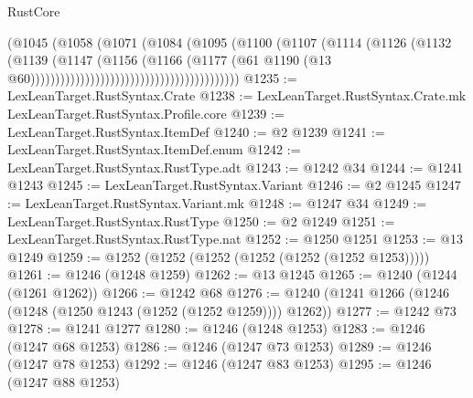 \begin{lexlean}{RustCore}
\begin{coremodule}
{\begin{coremodule}
{{{{{{{{{{{{{{{{{{{{{{{{{{{{{{{{{{{{{{{{{{{{{                                                      (@1045
                                                        (@1058
                                                          (@1071
                                                            (@1084
                                                              (@1095
                                                                (@1100
                                                                  (@1107
                                                                    (@1114
                                                                      (@1126
                                                                        (@1132
                                                                          (@1139
                                                                            (@1147
                                                                              (@1156
                                                                                (@1166
                                                                                  (@1177
                                                                                    (@61
                                                                                      @1190
                                                                                      (@13
                                                                                        @60))))))))))))))))))))))))))))))))))))))))))
@1235 := LexLeanTarget.RustSyntax.Crate
@1238 := LexLeanTarget.RustSyntax.Crate.mk LexLeanTarget.RustSyntax.Profile.core
@1239 := LexLeanTarget.RustSyntax.ItemDef
@1240 := @2 @1239
@1241 := LexLeanTarget.RustSyntax.ItemDef.enum
@1242 := LexLeanTarget.RustSyntax.RustType.adt
@1243 := @1242 @34
@1244 := @1241 @1243
@1245 := LexLeanTarget.RustSyntax.Variant
@1246 := @2 @1245
@1247 := LexLeanTarget.RustSyntax.Variant.mk
@1248 := @1247 @34
@1249 := LexLeanTarget.RustSyntax.RustType
@1250 := @2 @1249
@1251 := LexLeanTarget.RustSyntax.RustType.nat
@1252 := @1250 @1251
@1253 := @13 @1249
@1259 := @1252 (@1252 (@1252 (@1252 (@1252 (@1252 @1253)))))
@1261 := @1246 (@1248 @1259)
@1262 := @13 @1245
@1265 := @1240 (@1244 (@1261 @1262))
@1266 := @1242 @68
@1276 := @1240 (@1241 @1266 (@1246 (@1248 (@1250 @1243 (@1252 (@1252 @1259)))) @1262))
@1277 := @1242 @73
@1278 := @1241 @1277
@1280 := @1246 (@1248 @1253)
@1283 := @1246 (@1247 @68 @1253)
@1286 := @1246 (@1247 @73 @1253)
@1289 := @1246 (@1247 @78 @1253)
@1292 := @1246 (@1247 @83 @1253)
@1295 := @1246 (@1247 @88 @1253)
}}}}}}}}}}}}}}}}}}}}}}}}}}}}}}}}}}}}}}}}}}}}}
\end{coremodule}}
\end{coremodule}
\end{lexlean}
